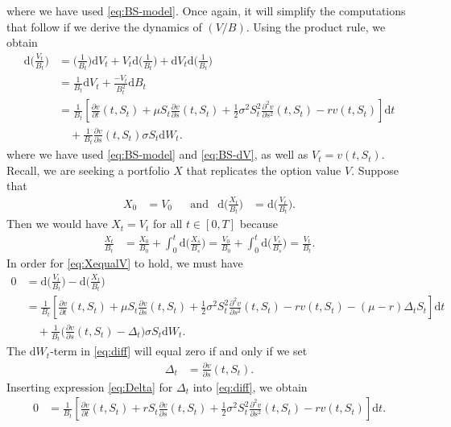 \documentclass[12pt]{book}
\numberwithin{equation}{chapter}
\theoremstyle{plain}
\numberwithin{theorem}{section}
\theoremstyle{definition}
\numberwithin{exercise}{chapter}
\newcommand{\<}{\langle}
\renewcommand{\>}{\rangle}
\renewcommand{\(}{\left(}
\renewcommand{\)}{\right)}
\renewcommand{\[}{\left[}
\renewcommand{\]}{\right]}
\newcommand\Del{\Delta}
\renewcommand\d{\partial}
\newcommand\dd{\mathrm{d}}
\theoremstyle{definition}
\numberwithin{question}{section}
\begin{document}
where we have used \eqref{eq:BS-model}.  Once again, it will simplify the computations that follow if we derive the dynamics of $(V/B)$.  Using the product rule, we obtain
\begin{align}
\dd \Big( \frac{V_t}{B_t} \Big)
	&=	\Big( \frac{1}{B_t} \Big) \dd V_t + V_t  \dd \Big( \frac{1}{B_t} \Big) + \dd V_t \dd \Big( \frac{1}{B_t} \Big) \\
	&= 	\frac{1}{B_t} \dd V_t + \frac{-V_t}{B_t^2} \dd B_t \\
	&=	\frac{1}{B_t} \[ \frac{\d v}{\d t}(t,S_t) + \mu S_t \frac{\d v}{\d s}(t,S_t) + \frac{1}{2} \sigma^2 S_t^2 \frac{\d^2 v}{\d s^2}(t,S_t) - r v(t,S_t) \] \dd t 
			\\ &\quad
			+ \frac{1}{B_t}  \frac{\d v}{\d s} (t,S_t) \sigma S_t \dd W_t . \label{eq:VoverB}
\end{align}
where we have used \eqref{eq:BS-model} and \eqref{eq:BS-dV}, as well as  $V_t = v(t,S_t)$.
\\[0.5em]
Recall, we are seeking a portfolio $X$ that replicates the option value $V$.  Suppose that
\begin{align}
X_0
	&=	V_0 &
&\text{and}&
\dd \Big( \frac{X_t}{B_t} \Big)
	&=	\dd \Big( \frac{V_t}{B_t} \Big) . \label{eq:XequalV}
\end{align}
Then we would have $X_t =	V_t$ for all $t \in [0,T]$ because
\begin{align}
\frac{X_t}{B_t}
	&=	\frac{X_0}{B_0} + \int_0^t \dd \Big( \frac{X_s}{B_s} \Big)
	 =	\frac{V_0}{B_0} + \int_0^t \dd \Big( \frac{V_s}{B_s} \Big) 
	 =  \frac{V_t}{B_t} .
\end{align}
In order for \eqref{eq:XequalV} to hold, we must have
\begin{align}
0
	&=	\dd \Big( \frac{V_t}{B_t} \Big) - \dd \Big( \frac{X_t}{B_t} \Big) \\
	&=	\frac{1}{B_t} \[ \frac{\d v}{\d t}(t,S_t) + \mu S_t \frac{\d v}{\d s}(t,S_t) + \frac{1}{2} \sigma^2 S_t^2 \frac{\d^2 v}{\d s^2}(t,S_t) - r v(t,S_t)
			- (\mu - r ) \Del_t S_t \] \dd t 
			\\ &\quad
			+ \frac{1}{B_t}  \Big( \frac{\d v}{\d s} (t,S_t) - \Del_t \Big) \sigma S_t \dd W_t . \label{eq:diff}
\end{align}
The $\dd W_t$-term in \eqref{eq:diff} will equal zero if and only if we set
\begin{align}
\Del_t
	&=	\frac{\d v}{\d s} (t,S_t) . \label{eq:Delta}
\end{align}
Inserting expression \eqref{eq:Delta} for $\Del_t$ into \eqref{eq:diff}, we obtain
\begin{align}
0
	&=	\frac{1}{B_t} \[ \frac{\d v}{\d t}(t,S_t) + r S_t \frac{\d v}{\d s}(t,S_t) + \frac{1}{2} \sigma^2 S_t^2 \frac{\d^2 v}{\d s^2}(t,S_t) - r v(t,S_t) \] \dd t . 
			\label{eq:dt-term}
\end{align}
\end{document}
